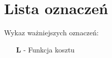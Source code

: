 \section*{Lista oznaczeń}

  \bigskip
  Wykaz ważniejszych oznaczeń:

  \begin{itemize}
    \item[$\mathbf{L}$] - Funkcja kosztu
  \end{itemize}
